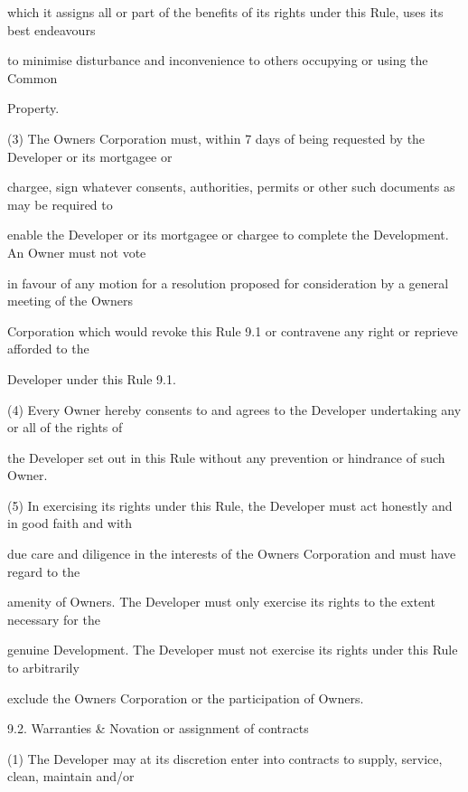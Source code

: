 \documentclass{article}
\begin{document}
{\fontsize{10.02}{1}which it assigns all or part of the benefits of its rights under this Rule, uses its best endeavours }

{\fontsize{10.02}{1}to minimise disturbance and inconvenience to others occupying or using the Common }

{\fontsize{10.02}{1}Property. }

{\fontsize{9.962}{1}(3) The Owners Corporation must, within 7 days of being requested by the Developer or its mortgagee or }

{\fontsize{10.02}{1}chargee, sign whatever consents, authorities, permits or other such documents as may be required to }

{\fontsize{10.02}{1}enable the Developer or its mortgagee or chargee to complete the Development. An Owner must not vote }

{\fontsize{10.02}{1}in favour of any motion for a resolution proposed for consideration by a general meeting of the Owners }

{\fontsize{10.02}{1}Corporation which would revoke this Rule 9.1 or contravene any right or reprieve afforded to the }

{\fontsize{10.02}{1}Developer under this Rule 9.1. }

{\fontsize{9.962}{1}(4) Every Owner hereby consents to and agrees to the Developer undertaking any or all of the rights of }

{\fontsize{10.02}{1}the Developer set out in this Rule without any prevention or hindrance of such Owner. }

{\fontsize{9.962}{1}(5) In exercising its rights under this Rule, the Developer must act honestly and in good faith and with }

{\fontsize{10.02}{1}due care and diligence in the interests of the Owners Corporation and must have regard to the }

{\fontsize{10.02}{1}amenity of Owners. The Developer must only exercise its rights to the extent necessary for the }

{\fontsize{10.02}{1}genuine Development. The Developer must not exercise its rights under this Rule to arbitrarily }

{\fontsize{10.02}{1}exclude the Owners Corporation or the participation of Owners. }

{\fontsize{9.99}{1}9.2. Warranties \& Novation or assignment of contracts }

{\fontsize{9.962}{1}(1) The Developer may at its discretion enter into contracts to supply, service, clean, maintain and/or }
\end{document}
